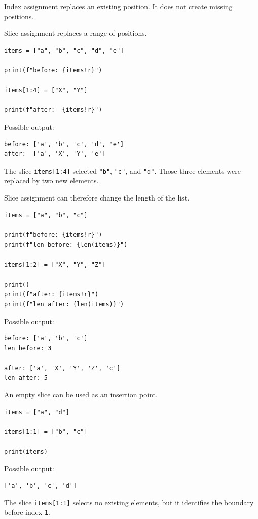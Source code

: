 Index assignment replaces an existing position. It does not create missing positions.

Slice assignment replaces a range of positions.

\begin{verbatim}
items = ["a", "b", "c", "d", "e"]

print(f"before: {items!r}")

items[1:4] = ["X", "Y"]

print(f"after:  {items!r}")
\end{verbatim}

Possible output:

\begin{verbatim}
before: ['a', 'b', 'c', 'd', 'e']
after:  ['a', 'X', 'Y', 'e']
\end{verbatim}

The slice \texttt{items[1:4]} selected \texttt{"b"}, \texttt{"c"}, and \texttt{"d"}. Those three elements were replaced by two new elements.

Slice assignment can therefore change the length of the list.

\begin{verbatim}
items = ["a", "b", "c"]

print(f"before: {items!r}")
print(f"len before: {len(items)}")

items[1:2] = ["X", "Y", "Z"]

print()
print(f"after: {items!r}")
print(f"len after: {len(items)}")
\end{verbatim}

Possible output:

\begin{verbatim}
before: ['a', 'b', 'c']
len before: 3

after: ['a', 'X', 'Y', 'Z', 'c']
len after: 5
\end{verbatim}

An empty slice can be used as an insertion point.

\begin{verbatim}
items = ["a", "d"]

items[1:1] = ["b", "c"]

print(items)
\end{verbatim}

Possible output:

\begin{verbatim}
['a', 'b', 'c', 'd']
\end{verbatim}

The slice \texttt{items[1:1]} selects no existing elements, but it identifies the boundary before index \texttt{1}.

